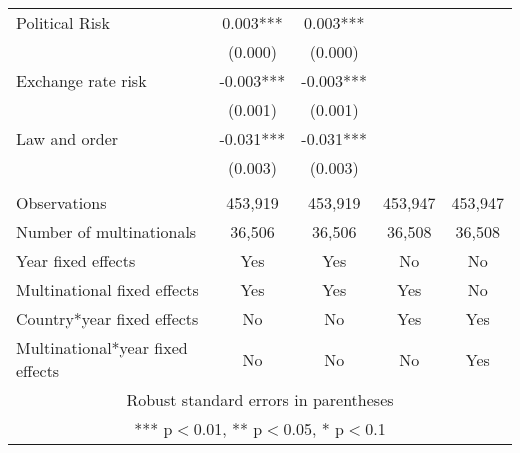 \begin{tabular}{lcccc}
Political Risk & 0.003*** & 0.003*** &  &  \\
 & (0.000) & (0.000) &  &  \\
Exchange rate risk & -0.003*** & -0.003*** &  &  \\
 & (0.001) & (0.001) &  &  \\
Law and order & -0.031*** & -0.031*** &  &  \\
 & (0.003) & (0.003) &  &  \\
 &  &  &  &  \\
Observations & 453,919 & 453,919 & 453,947 & 453,947 \\
Number of multinationals & 36,506 & 36,506 & 36,508 & 36,508 \\
Year fixed effects & Yes & Yes & No & No \\
Multinational fixed effects & Yes & Yes & Yes & No \\
Country*year fixed effects & No & No & Yes & Yes \\
 Multinational*year fixed effects & No & No & No & Yes \\ \hline
\multicolumn{5}{c}{ Robust standard errors in parentheses} \\
\multicolumn{5}{c}{ *** p$<$0.01, ** p$<$0.05, * p$<$0.1} \\
\end{tabular}

